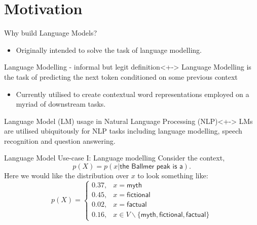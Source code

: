 \section{Motivation}

\begin{frame}{Why build Language Models?}
\begin{itemize}
    \item Originally intended to solve the task of language modelling.
\end{itemize}

\begin{block}{Language Modelling - informal but legit definition}<+->
Language Modelling is the task of predicting the next token conditioned on some previous context
\end{block}
\begin{itemize}
    \item Currently utilised to create contextual word representations employed on a myriad of downstream tasks.
\end{itemize}
\begin{block}{Language Model (LM) usage in Natural Language Processing (NLP)}<+->
	LMs are utilised ubiquitously for NLP tasks including language modelling, speech recognition and question answering.
\end{block}
\end{frame}

\begin{frame}{Language Model Use-case I: Language modelling}
Consider the context,
    \begin{equation*}
    p(X) = p(x|\textsf{the Ballmer peak is a}).
\end{equation*}
Here we would like the distribution over $x$ to look something like:
\begin{equation*}
    p(X) =  
    \begin{cases}
        0.37, & x=\textsf{myth} \\
        0.45, & x=\textsf{fictional} \\
        0.02, & x=\textsf{factual} \\
        0.16, & x \in V \backslash \{\textsf{myth}, \textsf{fictional}, \textsf{factual}\}
    \end{cases}
\end{equation*}
\end{frame}

